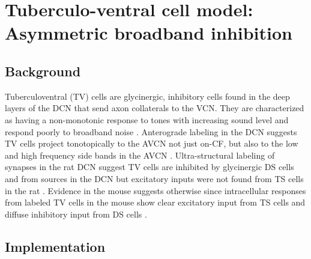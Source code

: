 
\graphicspath{{/media/data/Work/cnstellate/TV_notch/}{/media/data/Work/Responses/}{/media/data/Work/cnstellate/}{/media/data/Work/thesis/ans2010/gfx/}}

\section{Tuberculo-ventral cell model: Asymmetric broadband inhibition }

\subsection{Background}


Tuberculoventral (TV) cells are glycinergic, inhibitory cells found in
the deep layers of the DCN that send axon collaterals to the VCN. They
are characterized as having a non-monotonic response to tones with
increasing sound level and respond poorly to broadband noise
\citep{SpirouDavisEtAl:1999,NelkenYoung:1997,ReissYoung:2005}.
Anterograde labeling in the DCN suggests TV cells project
tonotopically to the AVCN not just on-CF, but also to the low and high
frequency side bands in the AVCN
\citep{MunirathinamOstapoffEtAl:2004,OstapoffMorestEtAl:1999}.
Ultra-structural labeling of synapses in the rat DCN suggest TV cells
are inhibited by glycinergic DS cells and from sources in the DCN but
excitatory inputs were not found from TS cells in the rat
\citep{Rubio:2005}. Evidence in the mouse suggests otherwise since
intracellular responses from labeled TV cells in the mouse show clear
excitatory input from TS cells and diffuse inhibitory input from DS
cells \citep{ZhangOertel:1993b,WickesbergOertel:1993}.

\subsection{Implementation}


